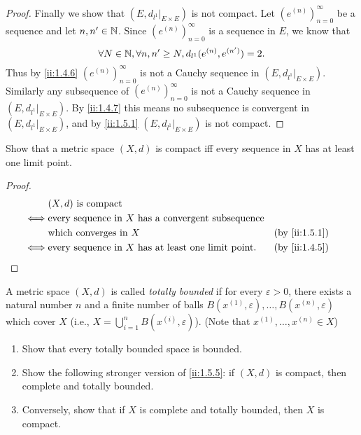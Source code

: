 \begin{proof}
  Finally we show that \((E, d_{l^1}|_{E \times E})\) is not compact.
  Let \((e^{(n)})_{n = 0}^\infty\) be a sequence and let \(n, n' \in \mathbb{N}\).
  Since \((e^{(n)})_{n = 0}^\infty\) is a sequence in \(E\), we know that
  \[
    \forall N \in \mathbb{N}, \forall n, n' \geq N, d_{l^1}(e^{(n)}, e^{(n')}) = 2.
  \]
  Thus by \cref{ii:1.4.6} \((e^{(n)})_{n = 0}^\infty\) is not a Cauchy sequence in \((E, d_{l^1}|_{E \times E})\).
  Similarly any subsequence of \((e^{(n)})_{n = 0}^\infty\) is not a Cauchy sequence in \((E, d_{l^1}|_{E \times E})\).
  By \cref{ii:1.4.7} this means no subsequence is convergent in \((E, d_{l^1}|_{E \times E})\), and by \cref{ii:1.5.1} \((E, d_{l^1}|_{E \times E})\) is not compact.
\end{proof}

\begin{ex}\label{ii:ex:1.5.9}
  Show that a metric space \((X, d)\) is compact iff every sequence in \(X\) has at least one limit point.
\end{ex}

\begin{proof}
  \begin{align*}
         & (X, d) \text{ is compact}                                                         \\
    \iff & \text{every sequence in } X \text{ has a convergent subsequence}                  \\
         & \text{which converges in } X                                      &  & \by{ii:1.5.1} \\
    \iff & \text{every sequence in } X \text{ has at least one limit point}. &  & \by{ii:1.4.5}
  \end{align*}
\end{proof}

\begin{ex}\label{ii:ex:1.5.10}
  A metric space \((X, d)\) is called \emph{totally bounded} if for every \(\varepsilon > 0\), there exists a natural number \(n\) and a finite number of balls \(B(x^{(1)}, \varepsilon), \dots, B(x^{(n)}, \varepsilon)\) which cover \(X\) (i.e., \(X = \bigcup_{i = 1}^n B(x^{(i)}, \varepsilon)\)).
  (Note that \(x^{(1)}, \dots, x^{(n)} \in X\))
  \begin{enumerate}
    \item Show that every totally bounded space is bounded.
    \item Show the following stronger version of \cref{ii:1.5.5}:
          if \((X, d)\) is compact, then complete and totally bounded.
    \item Conversely, show that if \(X\) is complete and totally bounded, then \(X\) is compact.
  \end{enumerate}
\end{ex}

